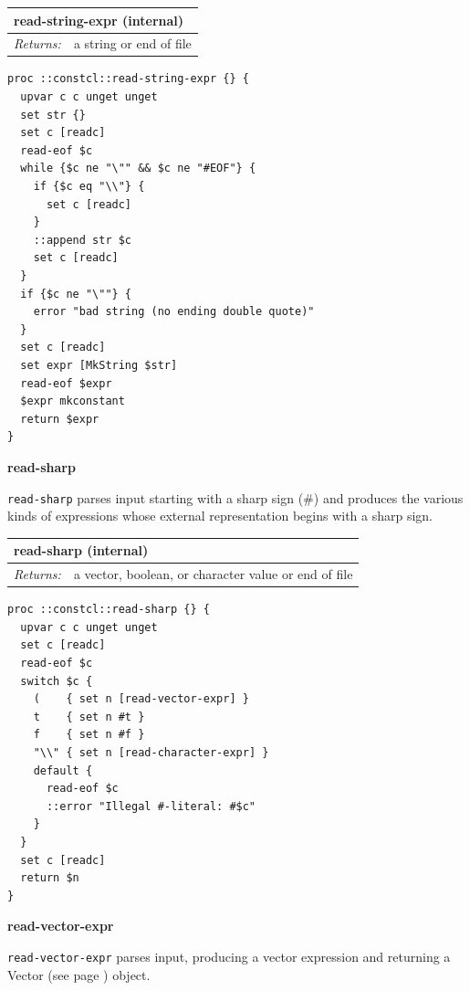 \documentclass[twoside,9pt]{report}
\begin{document}
\begin{tabular}{ |l l| }
\hline
\multicolumn{2}{|l|}{read-string-expr (internal)} \\
\hline
\textit{Returns:} & a string or end of file \\
\hline
\end{tabular}

\noindent\makebox[\linewidth]{\rule{\linewidth}{0.4pt}}
\begin{lstlisting}
proc ::constcl::read-string-expr {} {
  upvar c c unget unget
  set str {}
  set c [readc]
  read-eof $c
  while {$c ne "\"" && $c ne "#EOF"} {
    if {$c eq "\\"} {
      set c [readc]
    }
    ::append str $c
    set c [readc]
  }
  if {$c ne "\""} {
    error "bad string (no ending double quote)"
  }
  set c [readc]
  set expr [MkString $str]
  read-eof $expr
  $expr mkconstant
  return $expr
}
\end{lstlisting}
\noindent\makebox[\linewidth]{\rule{\linewidth}{0.4pt}}

\textbf{read-sharp}


\texttt{read-sharp} parses input starting with a sharp sign (\#) and produces the various kinds of expressions whose external representation begins with a sharp sign.

\begin{tabular}{ |l l| }
\hline
\multicolumn{2}{|l|}{read-sharp (internal)} \\
\hline
\textit{Returns:} & a vector, boolean, or character value or end of file \\
\hline
\end{tabular}

\noindent\makebox[\linewidth]{\rule{\linewidth}{0.4pt}}
\begin{lstlisting}
proc ::constcl::read-sharp {} {
  upvar c c unget unget
  set c [readc]
  read-eof $c
  switch $c {
    (    { set n [read-vector-expr] }
    t    { set n #t }
    f    { set n #f }
    "\\" { set n [read-character-expr] }
    default {
      read-eof $c
      ::error "Illegal #-literal: #$c"
    }
  }
  set c [readc]
  return $n
}
\end{lstlisting}
\noindent\makebox[\linewidth]{\rule{\linewidth}{0.4pt}}

\textbf{read-vector-expr}


\texttt{read-vector-expr} parses input, producing a vector expression and returning a Vector (see page \pageref{vectors}) object.
\end{document}
